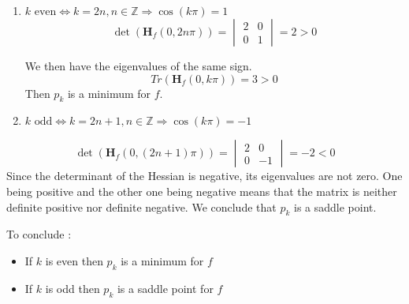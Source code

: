 \documentclass[../convex_optimization.tex]{subfiles}
\begin{document}
\begin{enumerate}
    \item $k\text{ even} \iff k=2n, n\in \mathbb Z \Rightarrow \cos(k\pi) = 1$
        \begin{equation}
            \det{(\mathbf H_f(0, 2n\pi))}=
            \begin{vmatrix}
                2  & 0\\
                0 &1
            \end{vmatrix} = 2>0\nonumber
        \end{equation}

We then have the eigenvalues of the same sign. 
\begin{equation}
    Tr(\mathbf H_f(0,k\pi)) = 3>0 \nonumber
\end{equation}
Then \(p_k\) is a minimum for $f$.

    \item $k\text{ odd} \iff k=2n+1, n\in \mathbb Z \Rightarrow \cos(k\pi) = -1$
\end{enumerate}
\begin{equation}
    \det{(\mathbf H_f(0, (2n+1)\pi))}=
    \begin{vmatrix}
        2  & 0\\
        0 & -1
    \end{vmatrix} = -2<0\nonumber
\end{equation}
Since the determinant of the Hessian is negative, its eigenvalues are not zero.
One being positive and the other one being negative means that the matrix is
neither definite positive nor definite negative. We conclude that $p_k$ is a saddle point.

To conclude :
\begin{itemize}
    \item If $k$ is even then $p_k$ is a minimum for $f$
    \item If $k$ is odd then $p_k$ is a saddle point for $f$
\end{itemize}
\end{document}
